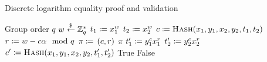 \begin{algorithm}[t]
\caption{Discrete logarithm equality proof and validation}
\label{alg:2_dlog_equality}
\begin{algorithmic}[1]
\Require Group order $q$
    \State $w \stackrel{\$}{\leftarrow}{} \mathbb{Z}_{q}^{*}$
    \State $t_{1} \coloneqq{} x_{1}^{w}$
    \State $t_{2} \coloneqq{} x_{2}^{w}$
    \State $c \coloneqq{} \textsc{Hash}(x_{1},y_{1},x_{2},y_{2},t_{1},t_{2})$
    \State $r \coloneqq{} w - c\alpha \mod q$
    \State $\pi \coloneqq{} \left( c,r \right)$
    \State \Return $\pi$
\EndProcedure
\State
{}
    \State $t_{1}' \coloneqq{} y_{1}^{c}x_{1}^{r}$
    \State $t_{2}' \coloneqq{} y_{2}^{c}x_{2}^{r}$
    \State $c' \coloneqq{}\textsc{Hash}(x_{1},y_{1},x_{2},y_{2},t_{1}',t_{2}')$
        \State \Return \textsf{True}
    \Else
        \State \Return \textsf{False}
    \EndIf
\EndProcedure
\end{algorithmic}
\end{algorithm}
